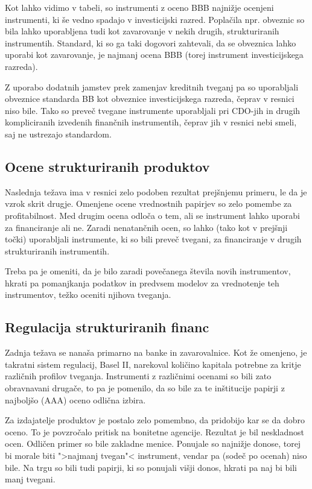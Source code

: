 \documentclass[12pt,a4paper]{amsart}
\theoremstyle{definition} %
\theoremstyle{plain} %
\begin{document}
Kot lahko vidimo v tabeli, so instrumenti z oceno BBB najnižje ocenjeni instrumenti, 
ki še vedno spadajo v investicijski razred. Poplačila npr. obveznic so bila lahko 
uporabljena tudi kot zavarovanje v nekih drugih, strukturiranih instrumentih. 
Standard, ki so ga taki dogovori zahtevali, da se obveznica lahko uporabi kot 
zavarovanje, je najmanj ocena BBB (torej instrument investicijskega razreda). 

Z uporabo dodatnih jamstev prek zamenjav kreditnih tveganj pa so uporabljali 
obveznice standarda BB kot obveznice investicijskega razreda, 
čeprav v resnici niso bile. Tako so preveč tvegane instrumente uporabljali pri 
CDO-jih in drugih kompliciranih izvedenih finančnih instrumentih, čeprav jih v 
resnici nebi smeli, saj ne ustrezajo standardom.

\subsection{Ocene strukturiranih produktov}
Naslednja težava ima v resnici zelo podoben rezultat prejšnjemu primeru, le da 
je vzrok skrit drugje. Omenjene ocene vrednostnih papirjev so zelo pomembe 
za profitabilnost. Med drugim ocena odloča o tem, ali se instrument lahko uporabi 
za financiranje ali ne. Zaradi nenatančnih ocen, so lahko (tako kot v prejšnji 
točki) uporabljali instrumente, ki so bili preveč tvegani, za financiranje v drugih 
strukturiranih instrumentih. 

Treba pa je omeniti, da je bilo zaradi povečanega števila novih instrumentov, 
hkrati pa pomanjkanja podatkov in predvsem modelov za vrednotenje teh 
instrumentov, težko oceniti njihova tveganja. 

\subsection{Regulacija strukturiranih financ}
Zadnja težava se nanaša primarno na banke in zavarovalnice. Kot že omenjeno, 
je takratni sistem regulacij, Basel II, narekoval količino kapitala potrebne za 
kritje različnih profilov tveganja. Instrumenti z različnimi ocenami so bili 
zato obravnavani drugače, to pa je pomenilo, da so bile za te inštitucije 
papirji z najboljšo (AAA) oceno odlična izbira.

Za izdajatelje produktov je postalo zelo pomembno, da pridobijo kar se da 
dobro oceno. To je povzročalo pritisk na bonitetne agencije. Rezultat je 
bil neskladnost ocen. Odličen primer so bile zakladne menice. Ponujale so 
najnižje donose, torej bi morale biti ">najmanj tvegan"< instrument, 
vendar pa (sodeč po ocenah) niso bile. Na trgu so bili tudi papirji, ki so 
ponujali višji donos, hkrati pa naj bi bili manj tvegani.
\end{document}
